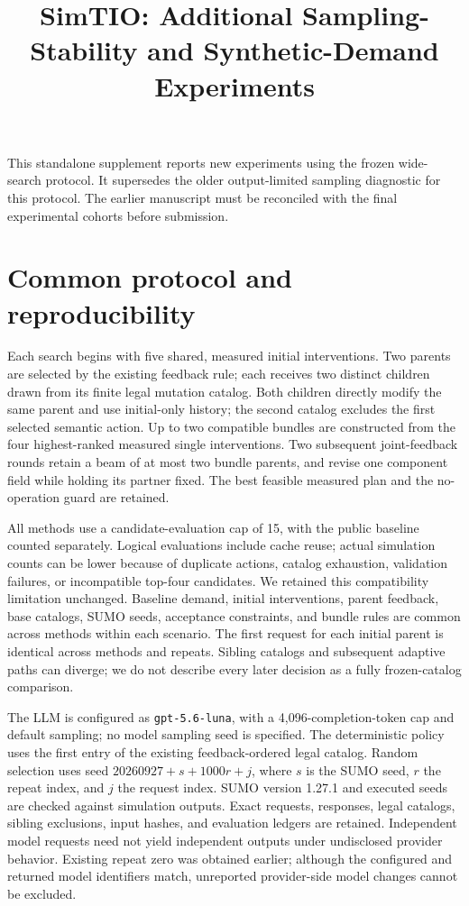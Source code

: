 \documentclass[11pt]{article}
\title{SimTIO: Additional Sampling-Stability and Synthetic-Demand Experiments}
\author{}
\date{}
\begin{document}
\maketitle
\noindent This standalone supplement reports new experiments using the frozen wide-search protocol. It supersedes the older output-limited sampling diagnostic for this protocol. The earlier manuscript must be reconciled with the final experimental cohorts before submission.

\section{Common protocol and reproducibility}
Each search begins with five shared, measured initial interventions. Two parents are selected by the existing feedback rule; each receives two distinct children drawn from its finite legal mutation catalog. Both children directly modify the same parent and use initial-only history; the second catalog excludes the first selected semantic action. Up to two compatible bundles are constructed from the four highest-ranked measured single interventions. Two subsequent joint-feedback rounds retain a beam of at most two bundle parents, and revise one component field while holding its partner fixed. The best feasible measured plan and the no-operation guard are retained.

All methods use a candidate-evaluation cap of 15, with the public baseline counted separately. Logical evaluations include cache reuse; actual simulation counts can be lower because of duplicate actions, catalog exhaustion, validation failures, or incompatible top-four candidates. We retained this compatibility limitation unchanged. Baseline demand, initial interventions, parent feedback, base catalogs, SUMO seeds, acceptance constraints, and bundle rules are common across methods within each scenario. The first request for each initial parent is identical across methods and repeats. Sibling catalogs and subsequent adaptive paths can diverge; we do not describe every later decision as a fully frozen-catalog comparison.

The LLM is configured as \texttt{gpt-5.6-luna}, with a 4,096-completion-token cap and default sampling; no model sampling seed is specified. The deterministic policy uses the first entry of the existing feedback-ordered legal catalog. Random selection uses seed $20260927+s+1000r+j$, where $s$ is the SUMO seed, $r$ the repeat index, and $j$ the request index. SUMO version 1.27.1 and executed seeds are checked against simulation outputs. Exact requests, responses, legal catalogs, sibling exclusions, input hashes, and evaluation ledgers are retained. Independent model requests need not yield independent outputs under undisclosed provider behavior. Existing repeat zero was obtained earlier; although the configured and returned model identifiers match, unreported provider-side model changes cannot be excluded.
\end{document}
